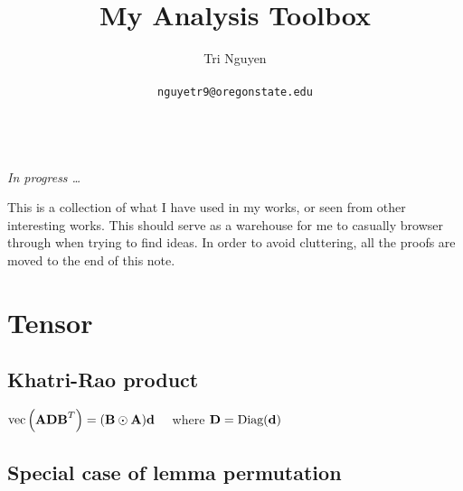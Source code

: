 \documentclass[11pt,a4paper]{article}
\title{My Analysis Toolbox}
\author{	Tri Nguyen \\\\
        \texttt{nguyetr9@oregonstate.edu} \\\\
        }
\begin{document}
\maketitle
{\red \it In progress \ldots  }

This is a collection of what I have used in my works, or seen from other interesting works. This should serve as a warehouse for me to casually browser through when trying to find ideas.
In order to avoid cluttering, all the proofs are moved to the end of this note.

\tableofcontents
\listoftheorems
\pagebreak

\section{Tensor}%
\label{sec:tensor}

\subsection{Khatri-Rao product}%
\label{sub:khatri_rao_product}
\begin{lemma} 
    \label{lemma: Khatri-Rao product}
    $\text{vec}\left(\textbf{A}\textbf{D}\textbf{B}^T\right) = (\textbf{B} \odot \textbf{A}) \textbf{d} \quad $
    where $\textbf{D} = \text{Diag(\textbf{d})} $
\end{lemma}

\subsection{Special case of lemma permutation}%
\label{sub:special_case_of_lemma_permutation}
\end{document}
